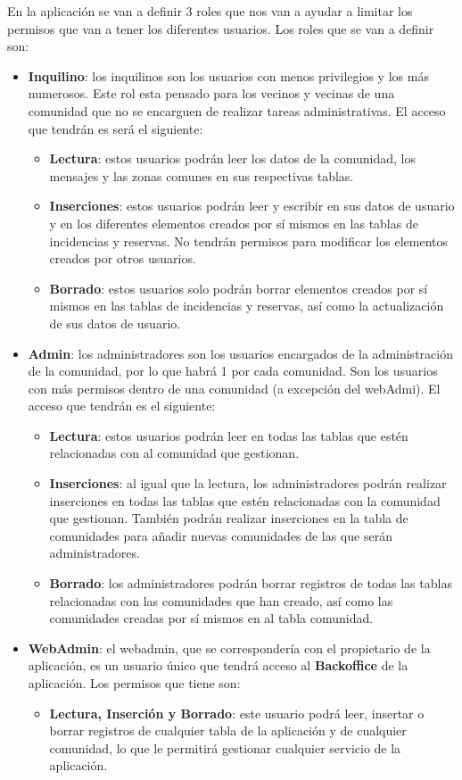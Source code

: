 En la aplicación se van a definir 3 roles que nos van a ayudar a limitar los permisos que van a tener los diferentes usuarios. Los roles que se van a definir son:

\begin{itemize}
	\item \textbf{Inquilino}: los inquilinos son los usuarios con menos privilegios y los más numerosos. Este rol esta pensado para los vecinos y vecinas de una comunidad que no se encarguen de realizar tareas administrativas. El acceso que tendrán es será el siguiente:
	\begin{itemize}
		\item \textbf{Lectura}: estos usuarios podrán leer los datos de la comunidad, los mensajes y las zonas comunes en sus respectivas tablas.
		\item \textbf{Inserciones}: estos usuarios podrán leer y escribir en sus datos de usuario y en los diferentes elementos creados por sí mismos en las tablas de incidencias y reservas. No tendrán permisos para modificar los elementos creados por otros usuarios.
		\item \textbf{Borrado}: estos usuarios solo podrán borrar elementos creados por sí mismos en las tablas de incidencias y reservas, así como la actualización de sus datos de usuario.
	\end{itemize}
	
	\item \textbf{Admin}: los administradores son los usuarios encargados de la administración de la comunidad, por lo que habrá 1 por cada comunidad. Son los usuarios con más permisos dentro de una comunidad (a excepción del webAdmi). El acceso que tendrán es el siguiente: 
		\begin{itemize}
		\item \textbf{Lectura}: estos usuarios podrán leer en todas las tablas que estén relacionadas con al comunidad que gestionan.
		\item \textbf{Inserciones}: al igual que la lectura, los administradores podrán realizar inserciones en todas las tablas que estén relacionadas con la comunidad que gestionan. También podrán realizar inserciones en la tabla de comunidades para añadir nuevas comunidades de las que serán administradores.
		\item \textbf{Borrado}: los administradores podrán borrar registros de todas las tablas relacionadas con las comunidades que han creado, así como las comunidades creadas por sí mismos en al tabla comunidad.
	\end{itemize}
	
	\item \textbf{WebAdmin}: el webadmin, que se correspondería con el propietario de la aplicación, es un usuario único que tendrá acceso al \textbf{Backoffice} de la aplicación. Los permisos que tiene son:
		\begin{itemize}
			\item \textbf{Lectura, Inserción y Borrado}: este usuario podrá leer, insertar o borrar registros de cualquier tabla de la aplicación y de cualquier comunidad, lo que le permitirá gestionar cualquier servicio de la aplicación.
		\end{itemize}
\end{itemize}

